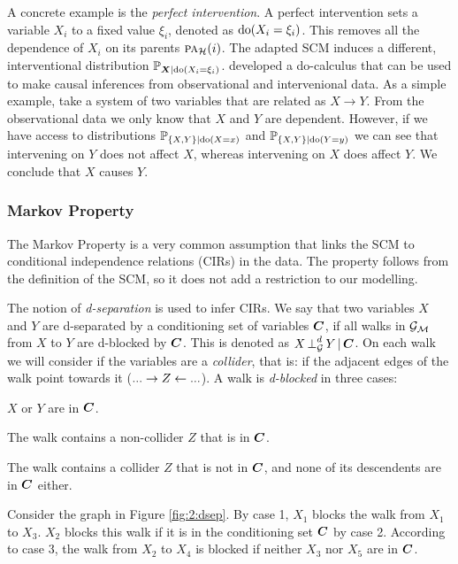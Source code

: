 A concrete example is the \textit{perfect intervention}. A perfect intervention sets a variable $X_i$ to a fixed value $\xi_i$, denoted as $\intervene(X_i=\xi_i)$. This removes all the dependence of $X_i$ on its parents $\pasub{\C{H}}{i}$. The adapted SCM induces a different, interventional distribution $\Prb_{\B{X}|\intervene(X_i=\xi_i)}$. \citet{pearl2009causality} developed a do-calculus that can be used to make causal inferences from observational and intervenional data. As a simple example, take a system of two variables that are related as $X\to Y$. From the observational data we only know that $X$ and $Y$ are dependent. However, if we have access to distributions $\Prb_{\{X,Y\}|\intervene(X=x)}$ and $\Prb_{\{X,Y\}|\intervene(Y=y)}$ we can see that intervening on $Y$ does not affect $X$, whereas intervening on $X$ does affect $Y$. We conclude that $X$ causes $Y$. 


\subsubsection{Markov Property}
The Markov Property is a very common assumption that links the SCM to conditional independence relations (CIRs) in the data. The property follows from the definition of the SCM, so it does not add a restriction to our modelling. 

The notion of \textit{d-separation} is used to infer CIRs. We say that two variables $X$ and $Y$ are d-separated by a conditioning set of variables $\B{C}$, if all walks in $\C{G}_{\C{M}}$ from $X$ to $Y$ are d-blocked by $\B{C}$. This is denoted as $\dsep{X}{Y}{\B{C}}{\C{G}}$. On each walk we will consider if the variables are a \textit{collider}, that is: if the adjacent edges of the walk point towards it ($...\to Z \ot ...$). A walk is \textit{d-blocked} in three cases:

\begin{compactenum}
    \item $X$ or $Y$ are in $\B{C}$.
    \item The walk contains a non-collider $Z$ that is in $\B{C}$.
    \item The walk contains a collider $Z$ that is not in $\B{C}$, and none of its descendents are in $\B{C}$ either.
\end{compactenum}

Consider the graph in Figure \ref{fig:2:dsep}. By case 1, $X_1$ blocks the walk from $X_1$ to $X_3$. $X_2$ blocks this walk if it is in the conditioning set $\B{C}$ by case 2. According to case 3, the walk from $X_2$ to $X_4$ is blocked if neither $X_3$ nor $X_5$ are in $\B{C}$.

